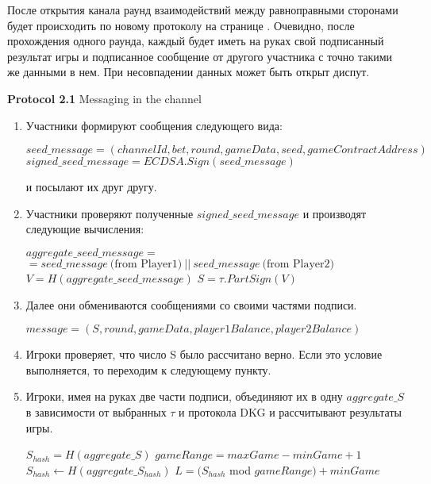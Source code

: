 После открытия канала раунд взаимодействий между равноправными сторонами будет происходить по новому протоколу на странице  \pageref{intchannel1} . Очевидно, после прохождения одного раунда, каждый будет иметь на руках свой подписанный результат игры и подписанное сообщение от другого участника с точно такими же данными в нем. При несовпадении данных может быть открыт диспут.
\begin{algorithm} 
\caption*{\textbf{Protocol 2.1} Messaging in the channel}
\begin{enumerate}
	\item Участники формируют сообщения следующего вида: \label{intchannel1}
\begin{center}
$ seed\_message = (channelId, bet, round, gameData, seed, gameContractAddress)$
$signed\_seed\_message = ECDSA.Sign(seed\_message)$ 
\end{center}
 и посылают их друг другу.
	\item Участники  проверяют полученные $signed\_seed\_message$ и производят следующие вычисления:
 \begin{algorithmic}
\State $aggregate\_seed\_message =$ \\ $= seed\_message \  \text{(from Player1)} \ ||  \ seed\_message \  \text{(from Player2)}$
\State $V = H(aggregate\_seed\_message)$
\State $S =  \tau .PartSign(V)$
 \end{algorithmic}
\item Далее они обмениваются сообщениями со своими частями подписи.
\begin{center}
 $message = (S, round, gameData, player1Balance, player2Balance)$
\end{center}
	\item Игроки проверяет, что число S было рассчитано верно. Если это условие выполняется, то переходим к следующему пункту.
	\item Игроки, имея на руках две части подписи, объединяют их в одну $aggregate\_S$ в зависимости от выбранных $\tau$ и протокола DKG и рассчитывают результаты игры.
\begin{algorithmic}
\State $S_{hash} = H(aggregate\_S)$
\State $gameRange = maxGame -  minGame + 1$
\State$ S_{hash}\gets H(aggregate\_S_{hash})$
\EndWhile
\State $L = (S_{hash}$ mod $gameRange) + minGame$
\end{algorithmic}
\end{enumerate}
\end{algorithm}
